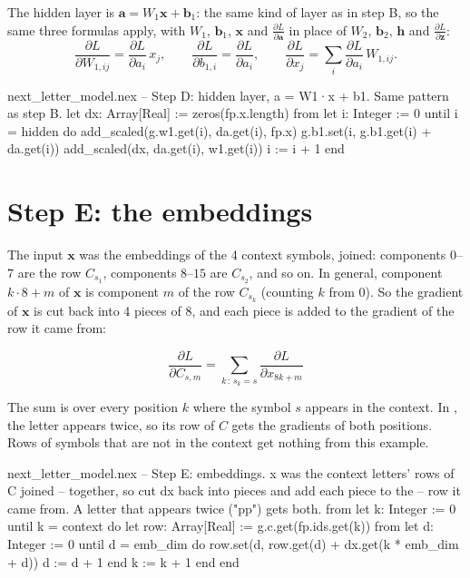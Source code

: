 \documentclass[11pt,a4paper,oneside,openany]{book}
\newcommand{\code}[1]{\texttt{\detokenize{#1}}}
\newcommand{\vect}[1]{\mathbf{#1}}
\newcommand{\pd}[2]{\frac{\partial #1}{\partial #2}}
\begin{document}
The hidden layer is $\vect{a} = W_1\vect{x} + \vect{b}_1$: the same kind
of layer as in step B, so the same three formulas apply, with $W_1$,
$\vect{b}_1$, $\vect{x}$ and $\pd{L}{\vect{a}}$ in place of $W_2$,
$\vect{b}_2$, $\vect{h}$ and $\pd{L}{\vect{z}}$:
\[
  \pd{L}{W_{1,ij}} = \pd{L}{a_i}\,x_j, \qquad
  \pd{L}{b_{1,i}} = \pd{L}{a_i}, \qquad
  \pd{L}{x_j} = \sum_i \pd{L}{a_i}\,W_{1,ij} .
\]

\begin{continued}{next_letter_model.nex}
    -- Step D: hidden layer, a = W1·x + b1. Same pattern as step B.
    let dx: Array[Real] := zeros(fp.x.length)
    from
      let i: Integer := 0
    until
      i = hidden
    do
      add_scaled(g.w1.get(i), da.get(i), fp.x)
      g.b1.set(i, g.b1.get(i) + da.get(i))
      add_scaled(dx, da.get(i), w1.get(i))
      i := i + 1
    end
\end{continued}

\section{Step E: the embeddings}

The input $\vect{x}$ was the embeddings of the 4 context symbols, joined:
components $0$--$7$ are the row $C_{s_1}$, components $8$--$15$ are
$C_{s_2}$, and so on. In general, component $k\cdot 8 + m$ of $\vect{x}$
is component $m$ of the row $C_{s_k}$ (counting $k$ from 0). So the
gradient of $\vect{x}$ is cut back into 4 pieces of 8, and each piece is
added to the gradient of the row it came from:

\begin{mathbox}[Step E]
\[
  \pd{L}{C_{s,m}} = \sum_{k \,:\, s_k = s} \pd{L}{x_{8k + m}}
\]
\end{mathbox}

The sum is over every position $k$ where the symbol $s$ appears in the
context. In \code{.app}, the letter \code{p} appears twice, so its row of
$C$ gets the gradients of both positions. Rows of symbols that are not in
the context get nothing from this example.

\begin{continued}{next_letter_model.nex}
    -- Step E: embeddings. x was the context letters' rows of C joined
    -- together, so cut dx back into pieces and add each piece to the
    -- row it came from. A letter that appears twice ("pp") gets both.
    from
      let k: Integer := 0
    until
      k = context
    do
      let row: Array[Real] := g.c.get(fp.ids.get(k))
      from
        let d: Integer := 0
      until
        d = emb_dim
      do
        row.set(d, row.get(d) + dx.get(k * emb_dim + d))
        d := d + 1
      end
      k := k + 1
    end
  end
\end{continued}
\end{document}
